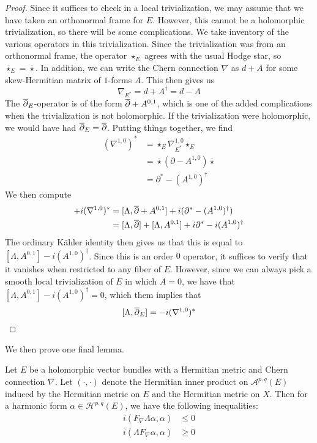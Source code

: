\begin{proof}
Since it suffices to check in a local trivialization, we may assume that we have
taken an orthonormal frame for $E$. However, this cannot be a holomorphic trivialization,
so there will be some complications. We take inventory of the various operators in
this trivialization. Since the trivialization was from an orthonormal frame, the
operator $\star_E$ agrees with the usual Hodge star, so
$\overline{\star}_E = \overline{\star}$. In addition, we can write the Chern connection
$\nabla$ as $d + A$ for some skew-Hermitian matrix of $1$-forms $A$. This then gives
us
\[
\nabla_{E^*} = d + A^\dagger = d - A
\]
The $\overline{\partial}_E$-operator is of the form  $\overline{\partial} + A^{0,1}$, which is one of the
added complications when the trivialization is not holomorphic. If the trivialization
were holomorphic, we would have had $\overline{\partial}_E = \overline{\partial}$. Putting things together, we find
\begin{align*}
(\nabla^{1,0})^* &= \overline{\star}_E\nabla_{E^*}^{1,0}\overline{\star}_E  \\
&= \overline{\star}(\partial - A^{1,0})\overline{\star} \\
&= \partial^* - (A^{1,0})^\dagger
\end{align*}
We then compute
\begin{align*}
[\Lambda,\dbar_E] + i(\nabla^{1,0})^* &=
[\Lambda, \dbar + A^{0,1}] + i(\partial^* - (A^{1,0})^\dagger) \\
&= [\Lambda,\dbar] + [\Lambda,A^{0,1}] + i\partial^* - i(A^{1,0})^\dagger
\end{align*}
The ordinary K\"ahler identity then gives us that this is equal to
$[\Lambda,A^{0,1}] - i(A^{1,0})^\dagger$. Since this is an order $0$ operator,
it suffices to verify that it vanishes when restricted to any fiber of $E$. However,
since we can always pick a smooth local trivialization of $E$ in which $A = 0$,
we have that $[\Lambda,A^{0,1}] - i(A^{1,0})^\dagger = 0$, which them
implies that
\[
[\Lambda,\overline{\partial}_E] = -i(\nabla^{1,0})^*
\]
\end{proof}
%
We then prove one final lemma.
%
\begin{lem}
Let $E$ be a holomorphic vector bundles with a Hermitian metric and Chern connection
$\nabla$. Let $(\cdot,\cdot)$ denote the Hermitian inner product on
$\mathcal{A}^{p,q}(E)$ induced by the Hermitian metric on $E$ and the Hermitian metric
on $X$. Then for a harmonic form $\alpha \in \mathcal{H}^{p,q}(E)$, we have the
following inequalities:
\begin{align*}
i(F_\nabla\Lambda\alpha,\alpha) &\leq 0 \\
i(\Lambda F_\nabla\alpha,\alpha) &\geq 0
\end{align*}
\end{lem}
